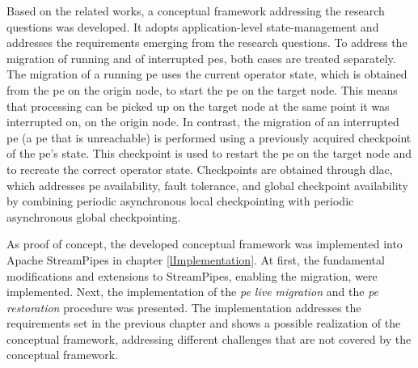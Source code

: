 Based on the related works, a conceptual framework addressing the research questions was developed. It adopts application-level state-management and addresses the requirements emerging from the research questions. To address the migration of running and of interrupted \gls{pe}s, both cases are treated separately. The migration of a running \gls{pe} uses the current operator state, which is obtained from the \gls{pe} on the origin node, to start the \gls{pe} on the target node. This means that processing can be picked up on the target node at the same point it was interrupted on, on the origin node. In contrast, the migration of an interrupted \gls{pe} (a \gls{pe} that is unreachable) is performed using a previously acquired checkpoint of the \gls{pe}'s state. This checkpoint is used to restart the \gls{pe} on the target node and to recreate the correct operator state. Checkpoints are obtained through \gls{dlac}, which addresses \gls{pe} availability, fault tolerance, and global checkpoint availability by combining periodic asynchronous local checkpointing with periodic asynchronous global checkpointing.\par

As proof of concept, the developed conceptual framework was implemented into Apache StreamPipes in chapter \ref{lImplementation}. At first, the fundamental modifications and extensions to StreamPipes, enabling the migration, were implemented. Next, the implementation of the \textit{\acrshort{pe} live migration} and the \textit{\acrshort{pe} restoration} procedure was presented. The implementation addresses the requirements set in the previous chapter and shows a possible realization of the conceptual framework, addressing different challenges that are not covered by the conceptual framework.\par

